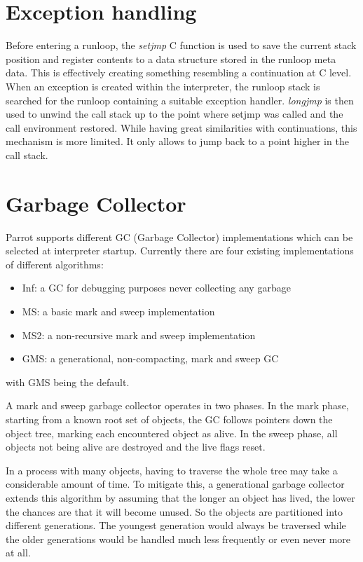 \documentclass[bachelor,english]{hgbthesis}
\begin{document}
\section{Exception handling}

Before entering a runloop, the \textit{setjmp} C function is used to save the current stack position and register contents to a data structure stored in the runloop meta data. This is effectively creating something resembling a continuation at C level. When an exception is created within the interpreter, the runloop stack is searched for the runloop containing a suitable exception handler. \textit{longjmp} is then used to unwind the call stack up to the point where setjmp was called and the call environment restored. While having great similarities with continuations, this mechanism is more limited. It only allows to jump back to a point higher in the call stack.

\section{Garbage Collector}

Parrot supports different GC (Garbage Collector) implementations which can be selected at interpreter startup. Currently there are four existing implementations of different algorithms:
\begin{itemize}
\item Inf: a GC for debugging purposes never collecting any garbage
\item MS: a basic mark and sweep implementation
\item MS2: a non-recursive mark and sweep implementation
\item GMS: a generational, non-compacting, mark and sweep GC
\end{itemize}
with GMS being the default.

A mark and sweep garbage collector operates in two phases. In the mark phase, starting from a known root set of objects, the GC follows pointers down the object tree, marking each encountered object as alive. In the sweep phase, all objects not being alive are destroyed and the live flags reset.

In a process with many objects, having to traverse the whole tree may take a considerable amount of time. To mitigate this, a generational garbage collector extends this algorithm by assuming that the longer an object has lived, the lower the chances are that it will become unused. So the objects are partitioned into different generations. The youngest generation would always be traversed while the older generations would be handled much less frequently or even never more at all.
\end{document}
